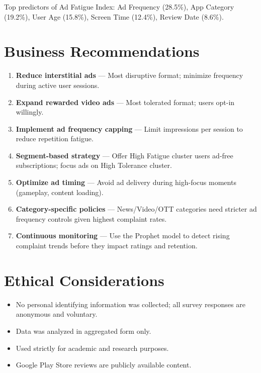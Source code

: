 \documentclass[12pt]{article}
\begin{document}
Top predictors of Ad Fatigue Index: Ad Frequency (28.5\%), App Category (19.2\%), User Age (15.8\%), Screen Time (12.4\%), Review Date (8.6\%).

\section{Business Recommendations}

\begin{enumerate}
    \item \textbf{Reduce interstitial ads} — Most disruptive format; minimize frequency during active user sessions.
    \item \textbf{Expand rewarded video ads} — Most tolerated format; users opt-in willingly.
    \item \textbf{Implement ad frequency capping} — Limit impressions per session to reduce repetition fatigue.
    \item \textbf{Segment-based strategy} — Offer High Fatigue cluster users ad-free subscriptions; focus ads on High Tolerance cluster.
    \item \textbf{Optimize ad timing} — Avoid ad delivery during high-focus moments (gameplay, content loading).
    \item \textbf{Category-specific policies} — News/Video/OTT categories need stricter ad frequency controls given highest complaint rates.
    \item \textbf{Continuous monitoring} — Use the Prophet model to detect rising complaint trends before they impact ratings and retention.
\end{enumerate}

\section{Ethical Considerations}

\begin{itemize}
    \item No personal identifying information was collected; all survey responses are anonymous and voluntary.
    \item Data was analyzed in aggregated form only.
    \item Used strictly for academic and research purposes.
    \item Google Play Store reviews are publicly available content.
\end{itemize}
\end{document}
